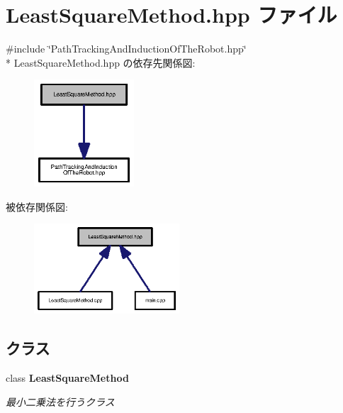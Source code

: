 \section{Least\-Square\-Method.\-hpp ファイル}
\label{_least_square_method_8hpp}
{\ttfamily \#include \char`\"{}Path\-Tracking\-And\-Induction\-Of\-The\-Robot.\-hpp\char`\"{}}\\*
Least\-Square\-Method.\-hpp の依存先関係図\-:\nopagebreak
\begin{figure}[H]
\begin{center}
\leavevmode
\includegraphics[width=106pt]{_least_square_method_8hpp__incl}
\end{center}
\end{figure}
被依存関係図\-:\nopagebreak
\begin{figure}[H]
\begin{center}
\leavevmode
\includegraphics[width=154pt]{_least_square_method_8hpp__dep__incl}
\end{center}
\end{figure}
\subsection*{クラス}
\begin{DoxyCompactItemize}
\item 
class {\bf Least\-Square\-Method}
\begin{DoxyCompactList}\small\item\em 最小二乗法を行うクラス \end{DoxyCompactList}\end{DoxyCompactItemize}
